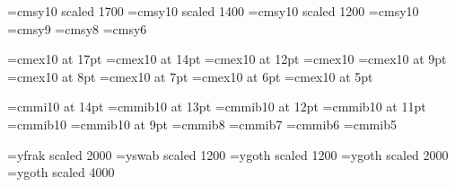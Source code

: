% 

\font\seventeensy=cmsy10 scaled 1700
\font\fourteensy=cmsy10 scaled 1400
\font\twelvesy=cmsy10 scaled 1200
\font\tensy=cmsy10
\font\ninesy=cmsy9
\font\eightsy=cmsy8
\font\sixsy=cmsy6


% 

\font\seventeenex=cmex10 at 17pt
\font\fourteenex=cmex10 at 14pt
\font\twelveex=cmex10 at 12pt
\font\tenex=cmex10
\font\nineex=cmex10 at 9pt
\font\eightex=cmex10 at 8pt
\font\sevenex=cmex10 at 7pt
\font\sixex=cmex10 at 6pt
\font\fiveex=cmex10 at 5pt

% 

\font\fourteengp=cmmi10 at 14pt
\font\thirteengp=cmmib10 at 13pt
\font\twelvegp=cmmib10 at 12pt
\font\elevengp=cmmib10 at 11pt
\font\tengp=cmmib10
\font\ninegp=cmmib10 at 9pt
\font\eightgp=cmmib8
\font\sevengp=cmmib7
\font\sixgp=cmmib6
\font\fivegp=cmmib5

% 

\font\yfrak=yfrak scaled 2000
\font\yswab=yswab scaled 1200
\font\twelveygoth=ygoth scaled 1200
\font\twentyygoth=ygoth scaled 2000
\font\thirtyygoth=ygoth scaled 4000





%

